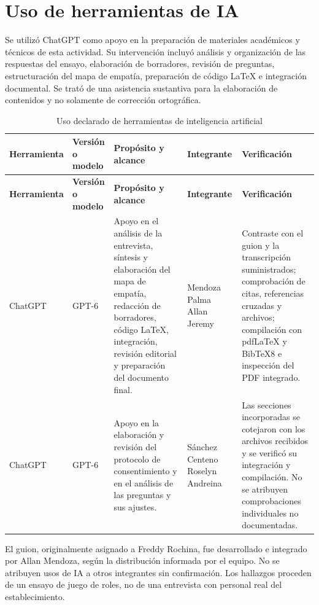 \section{Uso de herramientas de IA}
\label{sec:uso-ia}

Se utilizó ChatGPT como apoyo en la preparación de materiales académicos y técnicos de esta actividad. Su intervención incluyó análisis y organización de las respuestas del ensayo, elaboración de borradores, revisión de preguntas, estructuración del mapa de empatía, preparación de código LaTeX e integración documental. Se trató de una asistencia sustantiva para la elaboración de contenidos y no solamente de corrección ortográfica.

\begingroup
\footnotesize
\setlength{\tabcolsep}{3pt}
\renewcommand{\arraystretch}{1.17}
\begin{longtable}{@{}>{\raggedright\arraybackslash}p{.125\linewidth}>{\raggedright\arraybackslash}p{.125\linewidth}>{\raggedright\arraybackslash}p{.245\linewidth}>{\raggedright\arraybackslash}p{.19\linewidth}>{\raggedright\arraybackslash}p{.23\linewidth}@{}}
\caption{Uso declarado de herramientas de inteligencia artificial}\label{tab:registro-uso-ia}\\
\toprule
\textbf{Herramienta} & \textbf{Versión o modelo} & \textbf{Propósito y alcance} & \textbf{Integrante} & \textbf{Verificación} \\
\midrule
\endfirsthead
\toprule
\textbf{Herramienta} & \textbf{Versión o modelo} & \textbf{Propósito y alcance} & \textbf{Integrante} & \textbf{Verificación} \\
\midrule
\endhead
\bottomrule
\endlastfoot
ChatGPT & GPT-6 & Apoyo en el análisis de la entrevista, síntesis y elaboración del mapa de empatía, redacción de borradores, código LaTeX, integración, revisión editorial y preparación del documento final. & Mendoza Palma Allan Jeremy & Contraste con el guion y la transcripción suministrados; comprobación de citas, referencias cruzadas y archivos; compilación con pdfLaTeX y BibTeX8 e inspección del PDF integrado. \\
ChatGPT & GPT-6 & Apoyo en la elaboración y revisión del protocolo de consentimiento y en el análisis de las preguntas y sus ajustes. & Sánchez Centeno Roselyn Andreina & Las secciones incorporadas se cotejaron con los archivos recibidos y se verificó su integración y compilación. No se atribuyen comprobaciones individuales no documentadas. \\
\end{longtable}
\endgroup

El guion, originalmente asignado a Freddy Rochina, fue desarrollado e integrado por Allan Mendoza, según la distribución informada por el equipo. No se atribuyen usos de IA a otros integrantes sin confirmación. Los hallazgos proceden de un ensayo de juego de roles, no de una entrevista con personal real del establecimiento.
